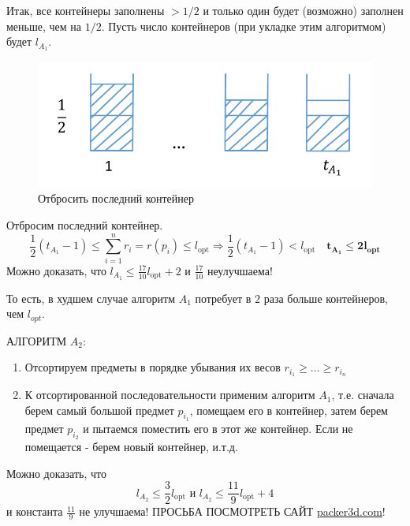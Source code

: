 \documentclass{article}
\numberwithin{example}{section}
\numberwithin{question}{section}
\numberwithin{Remark}{section}
\numberwithin{theorem}{section}
\numberwithin{definition}{section}
\numberwithin{proposition}{section}
\begin{document}
Итак, все контейнеры заполнены $>1/2$ и только один будет (возможно) заполнен меньше, чем на $1/2$. Пусть число контейнеров (при укладке этим алгоритмом) будет $l_{A_1}$.
\begin{figure}[!htp]
	\centering
	\includegraphics[width=0.4\linewidth]{12-7}
	\caption{Отбросить последний контейнер}
\end{figure}
Отбросим последний контейнер.
\begin{equation*}
\frac{1}{2}(t_{A_1}-1)\leqslant\sum_{i=1}^{n} r_i=r(p_i)\leqslant l_{\text{opt}}\Rightarrow \frac{1}{2} (t_{A_1}-1)<l_{\text{opt}}\quad \bm{t_{A_1}\leqslant 2 l_{\text{opt}}}
\end{equation*}
Можно доказать, что $l_{A_1}\leqslant \frac{17}{10}l_{\text{opt}}+2$ и $\frac{17}{10}$ неулучшаема!

То есть, в худшем случае алгоритм $A_1$ потребует в $2$ раза больше контейнеров, чем $l_{opt}$.

АЛГОРИТМ $A_2$:
\begin{enumerate}
	\item Отсортируем предметы в порядке убывания их весов $r_{i_1}\geqslant\ldots\geqslant r_{i_n}$
	\item К отсортированной последовательности применим алгоритм $A_1$, т.е. сначала берем самый большой предмет $p_{i_1}$, помещаем его в контейнер, затем берем предмет $p_{i_2}$ и пытаемся поместить его в этот же контейнер. Если не помещается - берем новый контейнер, и.т.д.   
\end{enumerate}
Можно доказать, что
\begin{equation*}
l_{A_2}\leqslant \frac{3}{2} l_{\text{opt}}\text{ и } l_{A_2}\leqslant \frac{11}{9} l_{\text{opt}}+4
\end{equation*}
и константа $\frac{11}{9}$ не улучшаема!
ПРОСЬБА ПОСМОТРЕТЬ САЙТ \url{packer3d.com}!
\end{document}
